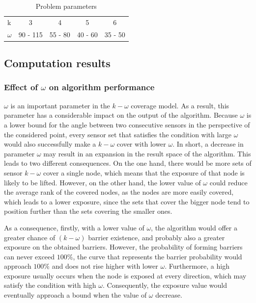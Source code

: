 \begin{table}[h!]
	\centering
	\begin{tabular}{l | c | c | c | c}
		k & 3 & 4 & 5 & 6\\
		$\omega$ & 90 - 115 & 55 - 80 & 40 - 60 & 35 - 50\\
	\end{tabular}
	\caption{Problem parameters}
\end{table}

\subsection{Computation results}

\subsubsection{Effect of $\omega$ on algorithm performance}

$\omega$ is an important parameter in the $k-\omega$ coverage model. As a result, this parameter has a considerable impact on the output of the algorithm. Because $\omega$ is a lower bound for the angle between two consecutive sensors in the perspective of the considered point, every sensor set that satisfies the condition with large $\omega$ would also successfully make a $k-\omega$ cover with lower $\omega$. In short, a decrease in parameter $\omega$ may result in an expansion in the result space of the algorithm. This leads to two different consequences. On the one hand, there would be more sets of sensor $k-\omega$ cover a single node, which means that the exposure of that node is likely to be lifted. However, on the other hand, the lower value of $\omega$ could reduce the average rank of the covered nodes, as the nodes are more easily covered, which leads to a lower exposure, since the sets that cover the bigger node tend to position further than the sets covering the smaller ones.

As a consequence, firstly, with a lower value of $\omega$, the algorithm would offer a greater chance of $(k-\omega)$ barrier existence, and probably also a greater exposure on the obtained barriers. However, the probability of forming barriers can never exceed $100\%$, the curve that represents the barrier probability would approach $100\%$ and does not rise higher with lower $\omega$. Furthermore, a high exposure usually occurs when the node is exposed at every direction, which may satisfy the condition with high $\omega$. Consequently, the exposure value would eventually approach a bound when the value of $\omega$ decrease.


